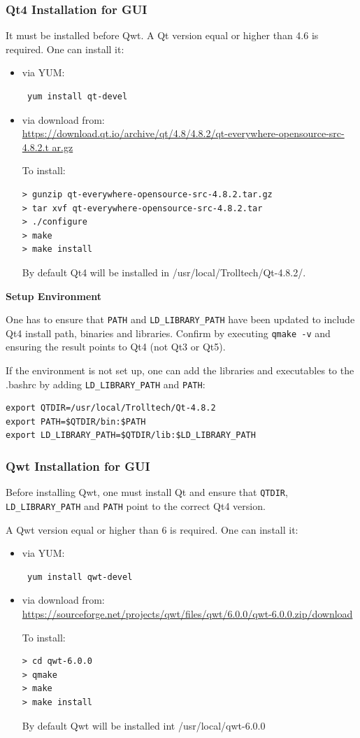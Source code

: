 \documentclass{article}
\begin{document}
\subsubsection{Qt4 Installation for GUI}
It must be installed before Qwt. A Qt version equal or higher than 4.6 is
required. One can install it:
\begin{itemize}
 \item via YUM:
\begin{verbatim}
 yum install qt-devel
\end{verbatim}
 \item via download from:\\
\url{
https://download.qt.io/archive/qt/4.8/4.8.2/qt-everywhere-opensource-src-4.8.2.t
ar.gz} 


To install:
\begin{verbatim}
> gunzip qt-everywhere-opensource-src-4.8.2.tar.gz
> tar xvf qt-everywhere-opensource-src-4.8.2.tar
> ./configure
> make
> make install
\end{verbatim}
By default Qt4 will be installed in /usr/local/Trolltech/Qt-4.8.2/. 
\end{itemize}


\textbf{Setup Environment} 


One has to ensure that \verb=PATH= and \verb=LD_LIBRARY_PATH= have
been updated to include Qt4 install path, binaries and libraries.
Confirm by executing \verb=qmake -v= and ensuring the result points to Qt4 (not
Qt3 or Qt5). 


If the environment is not set up, one can add the libraries and
executables to the .bashrc by adding
\verb=LD_LIBRARY_PATH= and \verb=PATH=:
\begin{verbatim}
export QTDIR=/usr/local/Trolltech/Qt-4.8.2
export PATH=$QTDIR/bin:$PATH
export LD_LIBRARY_PATH=$QTDIR/lib:$LD_LIBRARY_PATH
\end{verbatim}


\subsubsection{Qwt Installation for GUI}
Before installing Qwt, one must install Qt
and ensure that \verb=QTDIR=, \verb=LD_LIBRARY_PATH= and \verb=PATH= point to
the correct Qt4
version.


A Qwt version equal or higher than 6 is required. One can
install it:
\begin{itemize}
 \item via YUM:
\begin{verbatim}
 yum install qwt-devel
\end{verbatim}
 \item via download from:\\
\url{
https://sourceforge.net/projects/qwt/files/qwt/6.0.0/qwt-6.0.0.zip/download}


To install:
\begin{verbatim}
> cd qwt-6.0.0
> qmake
> make
> make install
\end{verbatim}
By default Qwt will be installed int /usr/local/qwt-6.0.0 
\end{itemize}
\end{document}
